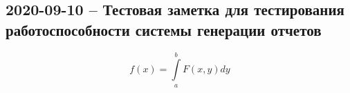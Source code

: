 \subsection{2020-09-10 -- Тестовая заметка для тестирования работоспособности системы генерации отчетов}

$$
f(x)=\int\limits_a^b F(x,y)dy
$$


